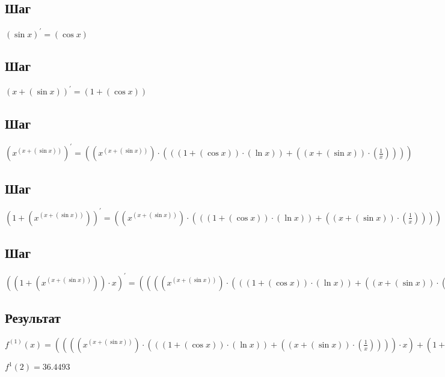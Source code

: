 \documentclass[12pt, letterpaper]{report}
\begin{document}
\subsection{Шаг}
\begin{center} $(\sin{x})^{\prime} = (\cos{x})$ \end{center} 

\subsection{Шаг}
\begin{center} $({x}+{(\sin{x})})^{\prime} = ({1}+{(\cos{x})})$ \end{center} 

\subsection{Шаг}
\begin{center} $({x}^{({x}+{(\sin{x})})})^{\prime} = ({({x}^{({x}+{(\sin{x})})})}\cdot{({({({1}+{(\cos{x})})}\cdot{(\ln{x})})}+{({({x}+{(\sin{x})})}\cdot{(\frac{1}{x})})})})$ \end{center} 

\subsection{Шаг}
\begin{center} $({1}+{({x}^{({x}+{(\sin{x})})})})^{\prime} = ({({x}^{({x}+{(\sin{x})})})}\cdot{({({({1}+{(\cos{x})})}\cdot{(\ln{x})})}+{({({x}+{(\sin{x})})}\cdot{(\frac{1}{x})})})})$ \end{center} 

\subsection{Шаг}
\begin{center} $({({1}+{({x}^{({x}+{(\sin{x})})})})}\cdot{x})^{\prime} = ({({({({x}^{({x}+{(\sin{x})})})}\cdot{({({({1}+{(\cos{x})})}\cdot{(\ln{x})})}+{({({x}+{(\sin{x})})}\cdot{(\frac{1}{x})})})})}\cdot{x})}+{({1}+{({x}^{({x}+{(\sin{x})})})})})$ \end{center} 

\subsection{Результат}
\begin{center} $f^{(1)}(x) = ({({({({x}^{({x}+{(\sin{x})})})}\cdot{({({({1}+{(\cos{x})})}\cdot{(\ln{x})})}+{({({x}+{(\sin{x})})}\cdot{(\frac{1}{x})})})})}\cdot{x})}+{({1}+{({x}^{({x}+{(\sin{x})})})})})$ \end{center} 
\begin{center} $f^{1}(2) = 36.4493$ \end{center}
\end{document}

